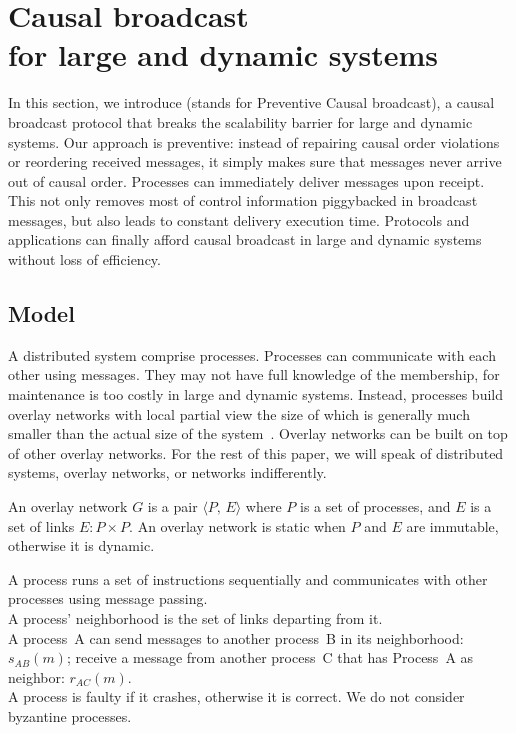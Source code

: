 
\section{Causal broadcast\\for large and dynamic systems}
\label{sec:proposal}

In this section, we introduce \CBROADCAST (stands for Preventive Causal
broadcast), a causal broadcast protocol that breaks the scalability barrier for
large and dynamic systems.  Our approach is preventive: instead of repairing
causal order violations or reordering received messages, it simply makes sure
that messages never arrive out of causal order. Processes can immediately
deliver messages upon receipt. This not only removes most of control information
piggybacked in broadcast messages, but also leads to constant delivery execution
time. Protocols and applications can finally afford causal broadcast in large
and dynamic systems without loss of efficiency.

\subsection{Model}

A distributed system comprise processes. Processes can communicate with each
other using messages. They may not have full knowledge of the membership, for
maintenance is too costly in large and dynamic systems. Instead, processes build
overlay networks with local partial view the size of which is generally much
smaller than the actual size of the
system~\cite{bertier-d2ht,jelasity2007gossip,jelasity2009tman}. Overlay networks
can be built on top of other overlay networks.  For the rest of this paper, we
will speak of distributed systems, overlay networks, or networks indifferently.

\begin{definition}
  An overlay network $G$ is a pair $\langle P,\, E\rangle$ where $P$ is a set of
  processes, and $E$ is a set of links $E: P\times P$. An overlay network is
  static when $P$ and $E$ are immutable, otherwise it
  is dynamic.
\end{definition}

\begin{definition}[Process]
  A process runs a set of instructions sequentially and communicates
  with other processes using message passing. \\
  A process' neighborhood is the set of links departing from it. \\
  A process~A can send messages to another process~B in its neighborhood:
  $s_{AB}(m)$; receive a message from another process~C that has Process~A as
  neighbor:
  $r_{AC}(m)$. \\
  A process is faulty if it crashes, otherwise it is correct. We do not consider
  byzantine processes.
\end{definition}

